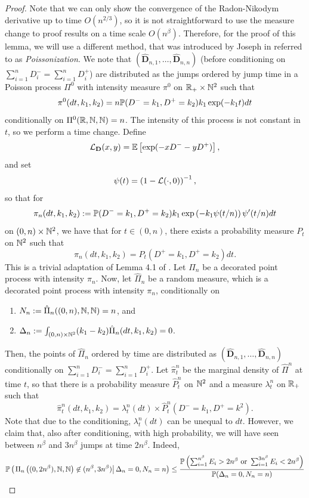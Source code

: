 \begin{proof}
Note that we can only show the convergence of the Radon-Nikodym derivative up to time $O(n^{2/3})$, so it is not straightforward to use the measure change to proof results on a time scale $O(n^\beta)$. Therefore, for the proof of this lemma, we will use a different method, that was introduced by Joseph in \cite{josephComponentSizesCritical2014} referred to as \emph{Poissonization}. We note that $(\mathbf{\hat{D}}_{n,1},\dots,\mathbf{\hat{D}}_{n,n})$ (before conditioning on $\sum_{i=1}^nD^-_i=\sum_{i=1}^nD^+_i$) are distributed as the jumps ordered by jump time in a Poisson process $\Pi^0$ with intensity measure $\pi^0$ on $\R_+\times \N^2$ such that $$\pi^0(dt,k_1,k_2)=n\P(D^-=k_1,D^+=k_2)k_1\exp(-k_1 t)dt$$
conditionally on $\Pi^0(\R,\N,\N)=n$.
The intensity of this process is not constant in $t$, so we perform a time change. Define
$$\cL_{\mathbf{D}}(x,y)=\E\left[\exp(-xD^--yD^+)\right],$$
and set 
$$\psi(t)=\left(1-\cL(\cdot,0)\right)^{-1},$$
so that for 
$$\pi_n(dt,k_1,k_2):=\P(D^-=k_1,D^+=k_2)k_1\exp\left(-k_1 \psi(t/n)\right)\psi'(t/n)dt$$
on $(0,n)\times \N^2$, we have that for $t\in (0,n)$, there exists a probability measure $P_t$ on $\N^2$ such that
$$\pi_n(dt,k_1,k_2)=P_t(D^+=k_1,D^+=k_2)dt.$$
This is a trivial adaptation of Lemma 4.1 of \cite{josephComponentSizesCritical2014}. Let ${\Pi}_n$ be a decorated point process with intensity $\pi_n$. Now, let $\hat{\Pi}_n$ be a random measure, which is a decorated point process with intensity $\pi_n$, conditionally on 
\begin{enumerate}
    \item $N_n:=\hat{\Pi}_n((0,n),\N,\N)=n$, and 
    \item $\Delta_n:=\int_{(0,n)\times \N^2}(k_1-k_2)\hat{\Pi}_n(dt,k_1,k_2)=0$.
\end{enumerate}
Then, the points of $\hat{\Pi}_n$ ordered by time are distributed as $(\mathbf{\hat{D}}_{n,1},\dots,\mathbf{\hat{D}}_{n,n})$ conditionally on $\sum_{i=1}^nD^-_i=\sum_{i=1}^nD^+_i$. Let $\hat{\pi}^n_t$ be the marginal density of $\hat{\Pi}^n$ at time $t$, so that there is a probability measure $\hat{P}^n_t$ on $\N^2$  and a measure $\lambda^n_t$ on $\R_+$ such that $$\hat{\pi}^n_t(dt,k_1,k_2)=\lambda^n_t(dt)\times \hat{P}^n_t(D^-=k_1, D^+=k^2).$$
Note that due to the conditioning, $\lambda^n_t(dt)$ can be unequal to $dt$. However, we claim that, also after conditioning, with high probability, we will have seen between $n^\beta$ and $3n^\beta$ jumps at time $2n^{\beta}$. Indeed,
\begin{align}\begin{split}\label{eq.numberofjumpsinrandommeasure}\P\left(\left.\Pi_n\left((0,2n^{\beta}),\N,\N\right)\not\in (n^\beta,3n^\beta)\right|\Delta_n=0, N_n=n\right)&\leq \frac{\P\left(\sum_{i=1}^{n^\beta}E_i>2n^{\beta}\text{ or }\sum_{i=1}^{3n^\beta}E_i<2n^{\beta}\right)}{\P(\Delta_n=0, N_n=n)}\\

\end{split}
\end{align}
\end{proof}
